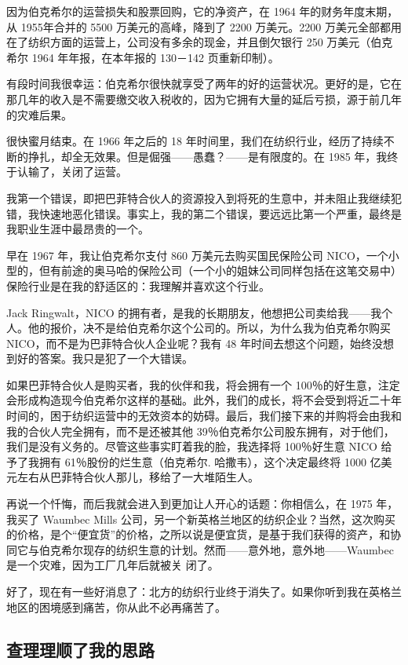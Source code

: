 \documentclass[UTF8,a4paper,zihao=-4,fontset = windows]{ctexart} %
\begin{document}
因为伯克希尔的运营损失和股票回购，它的净资产，在 1964 年的财务年度末期，从 1955年合并的 5500 万美元的高峰，降到了 2200 万美元。2200 万美元全部都用在了纺织方面的运营上，公司没有多余的现金，并且倒欠银行 250 万美元（伯克希尔 1964 年年报，在本年报的 130－142 页重新印制）。

有段时间我很幸运：伯克希尔很快就享受了两年的好的运营状况。更好的是，它在那几年的收入是不需要缴交收入税收的，因为它拥有大量的延后亏损，源于前几年的灾难后果。

很快蜜月结束。在 1966 年之后的 18 年时间里，我们在纺织行业，经历了持续不断的挣扎，却全无效果。但是倔强——愚蠢？——是有限度的。在 1985 年，我终于认输了，关闭了运营。

我第一个错误，即把巴菲特合伙人的资源投入到将死的生意中，并未阻止我继续犯错，我快速地恶化错误。事实上，我的第二个错误，要远远比第一个严重，最终是我职业生涯中最昂贵的一个。

早在 1967 年，我让伯克希尔支付 860 万美元去购买国民保险公司 NICO，一个小型的，但有前途的奥马哈的保险公司（一个小的姐妹公司同样包括在这笔交易中）保险行业是在我的舒适区的：我理解并喜欢这个行业。

Jack Ringwalt，NICO 的拥有者，是我的长期朋友，他想把公司卖给我——我个人。他的报价，决不是给伯克希尔这个公司的。所以，为什么我为伯克希尔购买 NICO，而不是为巴菲特合伙人企业呢？我有 48 年时间去想这个问题，始终没想到好的答案。我只是犯了一个大错误。

如果巴菲特合伙人是购买者，我的伙伴和我，将会拥有一个 100％的好生意，注定会形成构造现今伯克希尔这样的基础。此外，我们的成长，将不会受到将近二十年时间的，困于纺织运营中的无效资本的妨碍。最后，我们接下来的并购将会由我和我的合伙人完全拥有，而不是还被其他 39％伯克希尔公司股东拥有，对于他们，我们是没有义务的。尽管这些事实盯着我的脸，我选择将 100％好生意 NICO 给予了我拥有 61％股份的烂生意（伯克希尔. 哈撒韦），这个决定最终将 1000 亿美元左右从巴菲特合伙人那儿，移给了一大堆陌生人。

再说一个忏悔，而后我就会进入到更加让人开心的话题：你相信么，在 1975 年，我买了 Waumbec Mills 公司，另一个新英格兰地区的纺织企业？当然，这次购买的价格，是个“便宜货”的价格，之所以说是便宜货，是基于我们获得的资产，和协同它与伯克希尔现存的纺织生意的计划。然而——意外地，意外地——Waumbec 是一个灾难，因为工厂几年后就被关
闭了。

好了，现在有一些好消息了：北方的纺织行业终于消失了。如果你听到我在英格兰地区的困境感到痛苦，你从此不必再痛苦了。
\subsection{查理理顺了我的思路}
\end{document}
